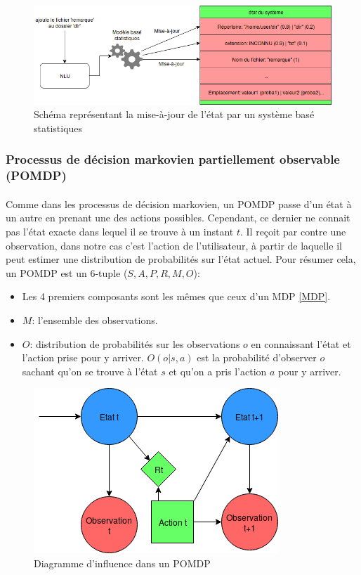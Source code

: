 \begin{figure}[H]
	\centering
	\includegraphics[width=.7\linewidth]{images/DM/StatBasedUpdate.png} 
	\caption{Schéma représentant la mise-à-jour de l'état par un système basé statistiques} 
\end{figure}

\subsubsection{Processus de décision markovien partiellement observable (POMDP)}
\paragraph{}
Comme dans les processus de décision markovien, un POMDP\cite{Astrom1965} passe d’un état à un autre en prenant une des actions possibles. Cependant, ce dernier ne connait pas l’état exacte dans lequel il se trouve à un instant $t$. Il reçoit par contre une observation, dans notre cas c’est l’action de l’utilisateur, à partir de laquelle il peut estimer une distribution de probabilités sur l’état actuel. Pour résumer cela, un POMDP est un 6-tuple ($S,A,P,R,M,O$):
\begin{itemize}
\item Les 4 premiers composants sont les mêmes que ceux d’un MDP \ref{MDP}.
\item $M$: l’ensemble des observations.
\item $O$: distribution de probabilités sur les observations $o$ en connaissant l’état et l’action prise pour y arriver. $O(o|s,a)$ est la probabilité d’observer $o$ sachant qu’on se trouve à l’état $s$ et qu’on a pris l’action $a$ pour y arriver.
\end{itemize}

\begin{figure}[H]
	\centering
	\includegraphics[width=.5\linewidth]{images/DM/POMDP.png} 
	\caption{Diagramme d'influence dans un POMDP} 
\end{figure}

